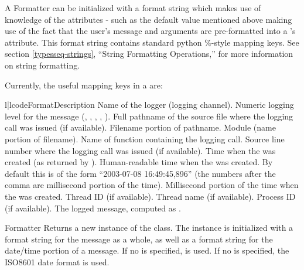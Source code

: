 A Formatter can be initialized with a format string which makes use of
knowledge of the  attributes - such as the default value
mentioned above making use of the fact that the user's message and
arguments are pre-formatted into a 's 
attribute.  This format string contains standard python \%-style
mapping keys. See section \ref{typesseq-strings}, ``String Formatting
Operations,'' for more information on string formatting.

Currently, the useful mapping keys in a  are:

\begin{tableii}{l|l}{code}{Format}{Description}
     {Name of the logger (logging channel).}
  {Numeric logging level for the message
                        (, ,
                        , ,
                        ).}
 {Full pathname of the source file where the logging
                        call was issued (if available).}
 {Filename portion of pathname.}
   {Module (name portion of filename).}
   {Name of function containing the logging call.}
   {Source line number where the logging call was issued
                        (if available).}
  {Time when the  was created (as
                        returned by ).}
  {Human-readable time when the 
                        was created.  By default this is of the form
                        ``2003-07-08 16:49:45,896'' (the numbers after the
                        comma are millisecond portion of the time).}
    {Millisecond portion of the time when the
                         was created.}
   {Thread ID (if available).}
   {Thread name (if available).}
  {Process ID (if available).}
  {The logged message, computed as .}
\end{tableii}

\begin{classdesc}{Formatter}{}
Returns a new instance of the  class. The
instance is initialized with a format string for the message as a whole,
as well as a format string for the date/time portion of a message. If
no  is specified,  is used. If no 
is specified, the ISO8601 date format is used.
\end{classdesc}

